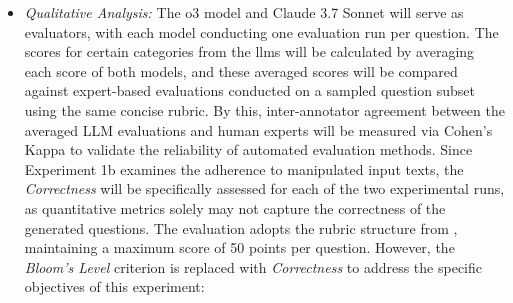 \begin{itemize}
\begin{itemize}
        \item \textit{Qualitative Analysis:} The o3 model and Claude 3.7 Sonnet will serve as evaluators, with each model conducting one evaluation run per question. The scores for certain categories from the \ac{llms} will be calculated by averaging each score of both models, and these averaged scores will be compared against expert-based evaluations conducted on a sampled question subset using the same concise rubric. By this, inter-annotator agreement between the averaged LLM evaluations and human experts  will be measured via Cohen's Kappa to validate the reliability of automated evaluation methods. Since Experiment 1b examines the adherence to manipulated input texts, the \textit{Correctness} will be specifically assessed for each of the two experimental runs, as quantitative metrics solely may not capture the correctness of the generated questions. The evaluation adopts the rubric structure from \cite{mi_comparative_2024}, maintaining a maximum score of 50 points per question. However, the \textit{Bloom's Level} criterion is replaced with \textit{Correctness} to address the specific objectives of this experiment:


\end{itemize}
\end{itemize}

